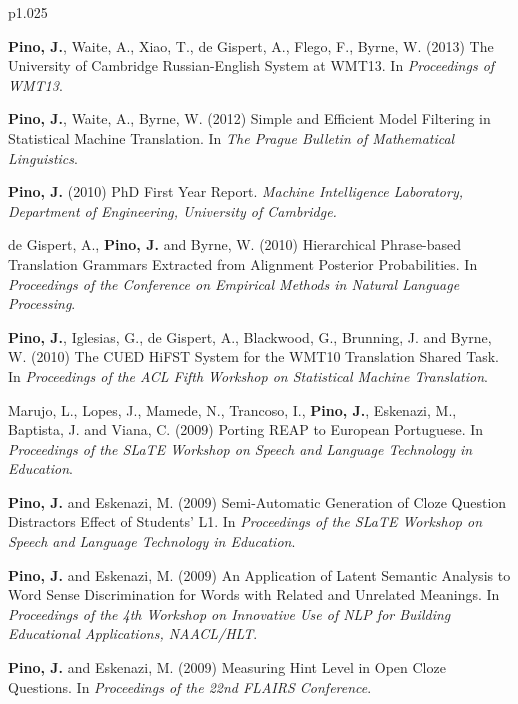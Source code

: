 \documentclass[letterpaper,11pt]{article}
\begin{document}
\begin{xtabular}{p{1.025\textwidth}}
   \\
   \begin{itemize*}
                   \item {\bf Pino, J.}, Waite, A., Xiao, T., de Gispert, A., Flego, F., Byrne, W. (2013) The University of Cambridge Russian-English System at WMT13. In {\it Proceedings of WMT13}.
                   \item {\bf Pino, J.}, Waite, A., Byrne, W. (2012) Simple and Efficient Model Filtering in Statistical Machine Translation. In {\it The Prague Bulletin of Mathematical Linguistics}.
                   \item {\bf Pino, J.} (2010) PhD First Year Report. {\it Machine Intelligence Laboratory, Department of Engineering, University of Cambridge.}
                   \item de Gispert, A., {\bf Pino, J.} and Byrne, W. (2010) Hierarchical Phrase-based Translation Grammars Extracted from Alignment Posterior Probabilities. In {\it Proceedings of the Conference on Empirical Methods in Natural Language Processing}.
                   \item {\bf Pino, J.}, Iglesias, G., de Gispert, A., Blackwood, G., Brunning, J. and Byrne, W. (2010) The CUED HiFST System for the WMT10 Translation Shared Task. In {\it Proceedings of the ACL Fifth Workshop on Statistical Machine Translation}.
                   \item Marujo, L., Lopes, J., Mamede, N., Trancoso, I., {\bf Pino, J.}, Eskenazi, M., Baptista, J. and Viana, C. (2009) Porting REAP to European Portuguese. In {\it Proceedings of the SLaTE Workshop on Speech and Language Technology in Education}. 
                   \item {\bf Pino, J.} and Eskenazi, M. (2009) Semi-Automatic Generation of Cloze Question Distractors Effect of Students' L1. In {\it Proceedings of the SLaTE Workshop on Speech and Language Technology in Education}. 
                   \item {\bf Pino, J.} and Eskenazi, M. (2009) An Application of Latent Semantic Analysis to Word Sense Discrimination for Words with Related and Unrelated Meanings. In {\it Proceedings of the 4th Workshop on Innovative Use of NLP for Building Educational Applications, NAACL/HLT}. 
                   \item {\bf Pino, J.} and Eskenazi, M. (2009) Measuring Hint Level in Open Cloze Questions. In {\it Proceedings of the 22nd FLAIRS Conference}. 

\end{itemize*}
\end{xtabular}
\end{document}
